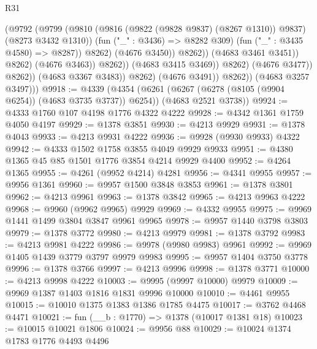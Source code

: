 \begin{lexlean}{R31}
\begin{coremodule}
                                            (@9792
                                              (@9799
                                                (@9810
                                                  (@9816 (@9822 (@9828 @9837) (@8267 @1310)) @9837)
                                                  (@8273 @3432 @1310))
                                                (fun ("_" : @3436) => @8282 @309)
                                                (fun ("_" : @3435 @4580) => @8287))
                                              @8262)
                                            (@4676 @3450))
                                          @8262))
                                      (@4683 @3461 @3451))
                                    @8262)
                                  (@4676 @3463))
                                @8262))
                            (@4683 @3415 @3469))
                          @8262)
                        (@4676 @3477))
                      @8262))
                  (@4683 @3367 @3483))
                @8262)
              (@4676 @3491))
            @8262))
        (@4683 @3257 @3497)))
@9918 := @4339
    (@4354
      (@6261 (@6267 (@6278 (@8105 (@9904 @6254)) (@4683 @3735 @3737)) @6254))
      (@4683 @2521 @3738))
@9924 := @4333 @1760 @107 @4198 @1776 @4322 @4222
@9928 := @4342 @1361 @1759 @4050 @4197
@9929 := @1378 @3851
@9930 := @4213 @9929
@9931 := @1378 @4043
@9933 := @4213 @9931 @4222
@9936 := @9928 (@9930 @9933) @4322
@9942 := @4333 @1502 @1758 @3855 @4049 @9929 @9933
@9951 := @4380 @1365 @45 @85 @1501 @1776 @3854 @4214 @9929 @4400
@9952 := @4264 @1365
@9955 := @4261 (@9952 @4214) @4281
@9956 := @4341 @9955
@9957 := @9956 @1361
@9960 := @9957 @1500 @3848 @3853
@9961 := @1378 @3801
@9962 := @4213 @9961
@9963 := @1378 @3842
@9965 := @4213 @9963 @4222
@9968 := @9960 (@9962 @9965) @9929
@9969 := @4332 @9955
@9975 := @9969 @1441 @1499 @3804 @3847 @9961 @9965
@9978 := @9957 @1440 @3798 @3803
@9979 := @1378 @3772
@9980 := @4213 @9979
@9981 := @1378 @3792
@9983 := @4213 @9981 @4222
@9986 := @9978 (@9980 @9983) @9961
@9992 := @9969 @1405 @1439 @3779 @3797 @9979 @9983
@9995 := @9957 @1404 @3750 @3778
@9996 := @1378 @3766
@9997 := @4213 @9996
@9998 := @1378 @3771
@10000 := @4213 @9998 @4222
@10003 := @9995 (@9997 @10000) @9979
@10009 := @9969 @1387 @1403 @1816 @1831 @9996 @10000
@10010 := @4461 @9955
@10015 := @10010 @1375 @1383 @1386 @1785 @4475
@10017 := @3762 @4468 @4471
@10021 := fun (__b : @1770) => @1378 (@10017 @1381 @18)
@10023 := @10015 @10021 @1806
@10024 := @9956 @88
@10029 := @10024 @1374 @1783 @1776 @4493 @4496

\end{coremodule}
\end{lexlean}
